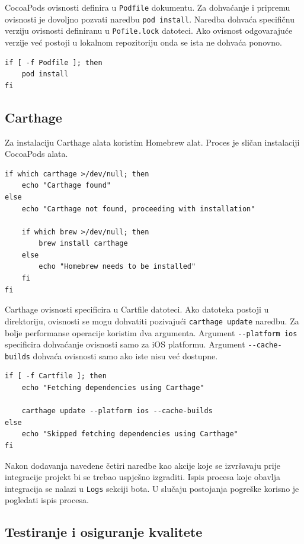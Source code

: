 \documentclass[times, utf8, diplomski, numeric]{fer}
\begin{document}
\begin{appendices}
CocoaPods ovisnosti definira u \verb|Podfile| dokumentu. Za dohvaćanje i pripremu ovisnosti je dovoljno pozvati naredbu \verb|pod install|. Naredba dohvaća specifičnu verziju ovisnosti definiranu u \verb|Pofile.lock| datoteci. Ako ovisnost odgovarajuće verzije već postoji u lokalnom repozitoriju onda se ista ne dohvaća ponovno.

\begin{verbatim}
if [ -f Podfile ]; then
    pod install
fi
\end{verbatim}


\subsection{Carthage}

Za instalaciju Carthage alata koristim Homebrew alat. Proces je sličan instalaciji CocoaPods alata.

\begin{verbatim}
if which carthage >/dev/null; then
    echo "Carthage found"
else
    echo "Carthage not found, proceeding with installation"

    if which brew >/dev/null; then
        brew install carthage
    else
        echo "Homebrew needs to be installed"
    fi
fi
\end{verbatim}

Carthage ovisnosti specificira u Cartfile datoteci. Ako datoteka postoji u direktoriju, ovisnosti se mogu dohvatiti pozivajući \verb|carthage update| naredbu. Za bolje performanse operacije koristim dva argumenta. Argument \verb|--platform ios| specificira dohvaćanje ovisnosti samo za iOS platformu. Argument \verb|--cache-builds| dohvaća ovisnosti samo ako iste nisu već dostupne.

\begin{verbatim}
if [ -f Cartfile ]; then
    echo "Fetching dependencies using Carthage"

    carthage update --platform ios --cache-builds
else
    echo "Skipped fetching dependencies using Carthage"
fi
\end{verbatim}

Nakon dodavanja navedene četiri naredbe kao akcije koje se izvršavaju prije integracije projekt bi se trebao uspješno izgraditi. Ispis procesa koje obavlja integracija se nalazi u \verb|Logs| sekciji bota. U slučaju postojanja pogreške korisno je pogledati ispis procesa.

\subsection{Testiranje i osiguranje kvalitete}


\end{appendices}
\end{document}

